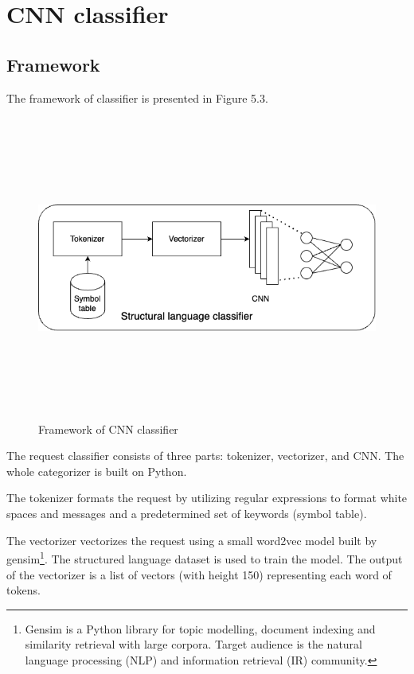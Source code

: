 \section{CNN classifier}
\label{sec:cnn_classfier}

\subsection{Framework}
\hspace{0.5cm}The framework of classifier is presented in Figure 5.3.
\begin{figure}[!h]
	\centering
	\includegraphics[width=\linewidth, height=10cm,keepaspectratio]{figures/structural.png}
  \caption{Framework of CNN classifier}
\end{figure} 
The request classifier consists of three parts: tokenizer, vectorizer, and CNN. The whole categorizer is built on Python.

The tokenizer formats the request by utilizing regular expressions to format white spaces and messages and a predetermined set of keywords (symbol table).

The vectorizer vectorizes the request using a small word2vec model built by gensim\footnote{Gensim is a Python library for topic modelling, document indexing and similarity retrieval with large corpora. Target audience is the natural language processing (NLP) and information retrieval (IR) community.}. The structured language dataset is used to train the model. The output of the vectorizer is a list of vectors (with height 150) representing each word of tokens.

